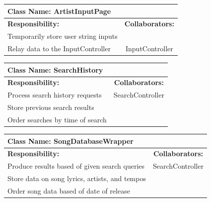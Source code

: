 \documentclass[]{article}
\begin{document}
	\begin{table}[!htb]
		\centering
		\begin{tabular}{| p{8cm} | c |} \hline
			\multicolumn{2}{|l|}{\textbf{Class Name: ArtistInputPage}} \\ \hline
			\textbf{Responsibility:} & \textbf{Collaborators:} \\ \hline
			Temporarily store user string inputs &   \\ \hline
			Relay data to the InputController & InputController \\ \hline
		\end{tabular}
	\end{table}
	
	\begin{table}[!htb]
		\centering
		\begin{tabular}{| p{8cm} | c |} \hline
			\multicolumn{2}{|l|}{\textbf{Class Name: SearchHistory}} \\ \hline
			\textbf{Responsibility:} & \textbf{Collaborators:} \\ \hline
			Process search history requests & SearchController \\ \hline
			Store previous search results &   \\ \hline
			Order searches by time of search &   \\ \hline
		\end{tabular}
	\end{table}
	
	\begin{table}[!htb]
		\centering
		\begin{tabular}{| p{8cm} | c |} \hline
			\multicolumn{2}{|l|}{\textbf{Class Name: SongDatabaseWrapper}} \\ \hline
			\textbf{Responsibility:} & \textbf{Collaborators:} \\ \hline
			Produce results based of given search queries & SearchController \\ \hline
			Store data on song lyrics, artists, and tempos &   \\ \hline
			Order song data based of date of release &   \\ \hline
		\end{tabular}
	\end{table}
	
\end{document}
